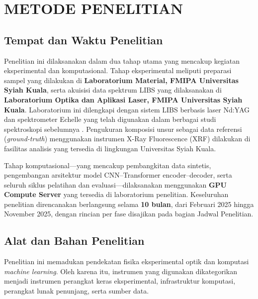\documentclass[12pt, a4paper]{article}
\begin{document}
\renewcommand{\contentsname}{DAFTAR ISI}
\tableofcontents
\newpage

\section{METODE PENELITIAN}

\subsection{Tempat dan Waktu Penelitian}

Penelitian ini dilaksanakan dalam dua tahap utama yang mencakup kegiatan eksperimental dan komputasional. Tahap eksperimental meliputi preparasi sampel yang dilakukan di \textbf{Laboratorium Material, FMIPA Universitas Syiah Kuala}, serta akuisisi data spektrum LIBS yang dilaksanakan di \textbf{Laboratorium Optika dan Aplikasi Laser, FMIPA Universitas Syiah Kuala}. Laboratorium ini dilengkapi dengan sistem LIBS berbasis laser Nd:YAG dan spektrometer Echelle yang telah digunakan dalam berbagai studi spektroskopi sebelumnya \cite{mitaphonna2023, mitaphonna2024, khumaeni2025}. Pengukuran komposisi unsur sebagai data referensi (\textit{ground-truth}) menggunakan instrumen X-Ray Fluorescence (XRF) dilakukan di fasilitas analisis yang tersedia di lingkungan Universitas Syiah Kuala.

Tahap komputasional---yang mencakup pembangkitan data sintetis, pengembangan arsitektur model CNN--Transformer encoder--decoder, serta seluruh siklus pelatihan dan evaluasi---dilaksanakan menggunakan \textbf{GPU Compute Server} yang tersedia di laboratorium penelitian. Keseluruhan penelitian direncanakan berlangsung selama \textbf{10 bulan}, dari Februari 2025 hingga November 2025, dengan rincian per fase disajikan pada bagian Jadwal Penelitian.


\subsection{Alat dan Bahan Penelitian}

Penelitian ini memadukan pendekatan fisika eksperimental optik dan komputasi \textit{machine learning}. Oleh karena itu, instrumen yang digunakan dikategorikan menjadi instrumen perangkat keras eksperimental, infrastruktur komputasi, perangkat lunak penunjang, serta sumber data.
\end{document}
